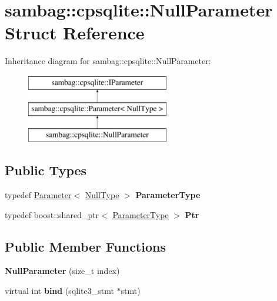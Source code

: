 \hypertarget{structsambag_1_1cpsqlite_1_1_null_parameter}{
\section{sambag::cpsqlite::NullParameter Struct Reference}
\label{structsambag_1_1cpsqlite_1_1_null_parameter}
}
Inheritance diagram for sambag::cpsqlite::NullParameter:\begin{figure}[H]
\begin{center}
\leavevmode
\includegraphics[height=3.000000cm]{structsambag_1_1cpsqlite_1_1_null_parameter}
\end{center}
\end{figure}
\subsection*{Public Types}
\begin{DoxyCompactItemize}
\item 
\hypertarget{structsambag_1_1cpsqlite_1_1_null_parameter_a33b34f566f126cf37142f2df3073dbd2}{
typedef \hyperlink{structsambag_1_1cpsqlite_1_1_parameter}{Parameter}$<$ \hyperlink{structsambag_1_1cpsqlite_1_1_null_type}{NullType} $>$ {\bfseries ParameterType}}
\label{structsambag_1_1cpsqlite_1_1_null_parameter_a33b34f566f126cf37142f2df3073dbd2}

\item 
\hypertarget{structsambag_1_1cpsqlite_1_1_null_parameter_ae025e168a12a0fdc80edc8c75a1382a6}{
typedef boost::shared\_\-ptr$<$ \hyperlink{structsambag_1_1cpsqlite_1_1_parameter_3_01_null_type_01_4}{ParameterType} $>$ {\bfseries Ptr}}
\label{structsambag_1_1cpsqlite_1_1_null_parameter_ae025e168a12a0fdc80edc8c75a1382a6}

\end{DoxyCompactItemize}
\subsection*{Public Member Functions}
\begin{DoxyCompactItemize}
\item 
\hypertarget{structsambag_1_1cpsqlite_1_1_null_parameter_a94c207c8c816df191de01cb54ef6c93d}{
{\bfseries NullParameter} (size\_\-t index)}
\label{structsambag_1_1cpsqlite_1_1_null_parameter_a94c207c8c816df191de01cb54ef6c93d}

\item 
\hypertarget{structsambag_1_1cpsqlite_1_1_null_parameter_aafc677ebd36499fed0e1caa24930143a}{
virtual int {\bfseries bind} (sqlite3\_\-stmt $\ast$stmt)}
\label{structsambag_1_1cpsqlite_1_1_null_parameter_aafc677ebd36499fed0e1caa24930143a}

\end{DoxyCompactItemize}
